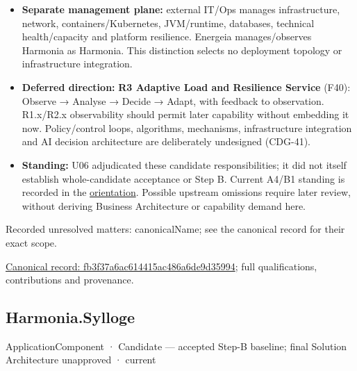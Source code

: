 \begin{itemize}
\item \textbf{Separate management plane:} external IT/Ops manages infrastructure, network,
  containers/Kubernetes, JVM/runtime, databases, technical health/capacity and
  platform resilience. Energeia manages/observes Harmonia as Harmonia. This
  distinction selects no deployment topology or infrastructure integration.

\item \textbf{Deferred direction:} \textbf{R3 Adaptive Load and Resilience Service} (F40):
  Observe → Analyse → Decide → Adapt, with feedback to observation. R1.x/R2.x
  observability should permit later capability without embedding it now.
  Policy/control loops, algorithms, mechanisms, infrastructure integration and
  AI decision architecture are deliberately undesigned (CDG-41).

\item \textbf{Standing:} U06 adjudicated these candidate responsibilities; it did not
  itself establish whole-candidate acceptance or Step B. Current A4/B1 standing
  is recorded in the \href{\detokenize{../../../../../docs/markdown/05-information-systems-architecture/README.md}}{orientation}. Possible upstream omissions require
  later review, without deriving Business Architecture or capability demand here.

\end{itemize}

{\small Recorded unresolved matters: canonicalName; see the canonical record for their exact scope.}\par
{\footnotesize \href{../../../../continuum/application/application-component/fb3f37a6ac614415ac486a6de9d35994.md}{Canonical record: fb3f37a6ac614415ac486a6de9d35994}; full qualifications, contributions and provenance.}\par
\subsection{Harmonia.Sylloge}

\label{element:feea742463b84021b66853d287d8916f}
{\small ApplicationComponent · Candidate — accepted Step-B baseline; final Solution Architecture unapproved · current}\par

